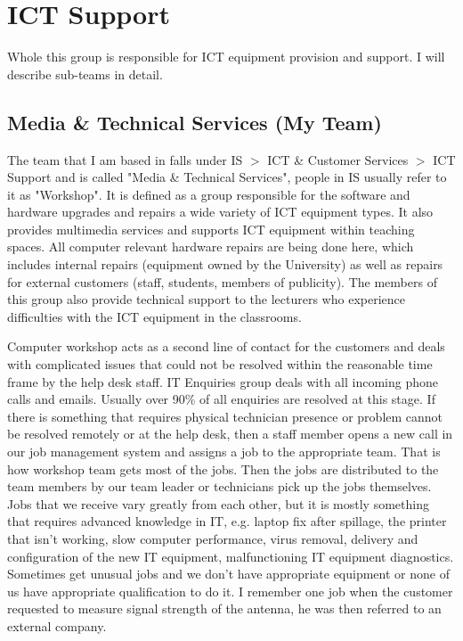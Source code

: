 \documentclass[10pt,a4paper,headinclude=true]{report}
\begin{document}
\section{ICT Support}
Whole this group is responsible for ICT equipment provision and support. I will describe sub-teams in detail.
\subsection{Media \& Technical Services (My Team)}
The team that I am based in falls under IS $>$ ICT \& Customer Services $>$ ICT Support and is called "Media \& Technical Services", people in IS usually refer to it as "Workshop". It is defined as a group responsible for the software and hardware upgrades and repairs a wide variety of ICT equipment types. It also provides multimedia services and supports ICT equipment within teaching spaces. All computer relevant hardware repairs are being done here, which includes internal repairs (equipment owned by the University) as well as repairs for external customers (staff, students, members of publicity). The members of this group also provide technical support to the lecturers who experience difficulties with the ICT equipment in the classrooms. 

Computer workshop acts as a second line of contact for the customers and deals with complicated issues that could not be resolved within the reasonable time frame by the help desk staff. IT Enquiries group deals with all incoming phone calls and emails. Usually over 90\% of all enquiries are resolved at this stage. If there is something that requires physical technician presence or problem cannot be resolved remotely or at the help desk, then a staff member opens a new call in our job management system and assigns a job to the appropriate team. That is how workshop team gets most of the jobs. Then the jobs are distributed to the team members by our team leader or technicians pick up the jobs themselves. Jobs that we receive vary greatly from each other, but it is mostly something that requires advanced knowledge in IT, e.g. laptop fix after spillage, the printer that isn't working, slow computer performance, virus removal, delivery and configuration of the new IT equipment, malfunctioning IT equipment diagnostics. Sometimes get unusual jobs and we don't have appropriate equipment or none of us have appropriate qualification to do it. I remember one job when the customer requested to measure signal strength of the antenna, he was then referred to an external company.
\end{document}
